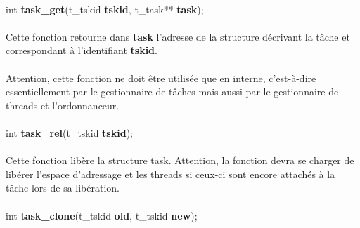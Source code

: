 \documentclass[10pt,a4wide]{article}
\begin{document}
\paragraph{}

\hspace{1.5cm}int \textbf{task\_get}(t\_tskid \textbf{tskid},
                                     t\_task** \textbf{task});

\paragraph{}

Cette fonction retourne dans \textbf{task} l'adresse de la structure
d\'ecrivant la t\^ache et correspondant \`a l'identifiant \textbf{tskid}.

\paragraph{}

Attention, cette fonction ne doit \^etre utilis\'ee que en interne,
c'est-\`a-dire essentiellement par le gestionnaire de t\^aches mais aussi
par le gestionnaire de threads et l'ordonnanceur.

\paragraph{}

\hspace{1.5cm}int \textbf{task\_rel}(t\_tskid \textbf{tskid});

\paragraph{}

Cette fonction lib\`ere la structure task. Attention, la fonction
devra se charger de lib\'erer l'espace d'adressage et les threads
si ceux-ci sont encore attach\'es \`a la t\^ache lors de sa lib\'eration.

\paragraph{}

\hspace{1.5cm}int \textbf{task\_clone}(t\_tskid \textbf{old},
                                       t\_tskid \textbf{new});

\paragraph{}
\end{document}
